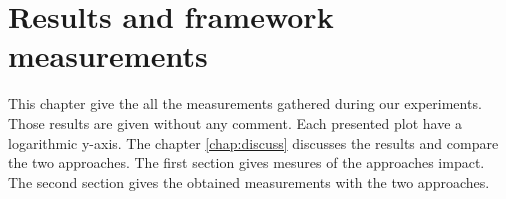 \chapter{Results and framework measurements \label{chap:results}}

This chapter give the all the measurements gathered during our experiments.
Those results are given without any comment.
Each presented plot have a logarithmic y-axis.
The chapter \ref{chap:discuss} discusses the results and compare the two approaches.
The first section gives mesures of the approaches impact.
The second section gives the obtained measurements with the two approaches.



